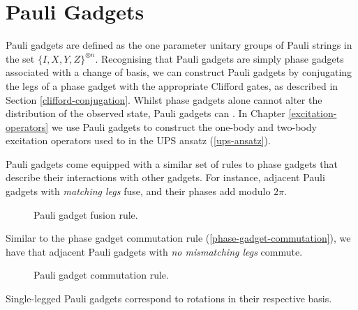 \section{Pauli Gadgets}%
\label{pauli-gadgets-section}

Pauli gadgets are defined as the one parameter unitary groups of Pauli strings in the set $\{I, X, Y, Z\}^{\otimes n}$. Recognising that Pauli gadgets are simply phase gadgets associated with a change of basis, we can construct Pauli gadgets by conjugating the legs of a phase gadget with the appropriate Clifford gates, as described in Section \ref{clifford-conjugation}. Whilst phase gadgets alone cannot alter the distribution of the observed state, Pauli gadgets can \cite{Yeung2020}. In Chapter \ref{excitation-operators} we use Pauli gadgets to construct the one-body and two-body excitation operators used to in the UPS ansatz (\ref{ups-ansatz}).


Pauli gadgets come equipped with a similar set of rules to phase gadgets that describe their interactions with other gadgets. For instance, adjacent Pauli gadgets with \textit{matching legs} fuse, and their phases add modulo $2\pi$.

\begin{figure}[H]
    \centering
    \caption{Pauli gadget fusion rule.}
    \label{pauli-gadget-fusion}
\end{figure}

Similar to the phase gadget commutation rule (\ref{phase-gadget-commutation}), we have that adjacent Pauli gadgets with \textit{no mismatching legs} commute.

\begin{figure}[H]
    \centering
    \caption{Pauli gadget commutation rule.}
    \label{pauli-gadget-commutation}
\end{figure}

Single-legged Pauli gadgets correspond to rotations in their respective basis.

\vspace{5pt}

